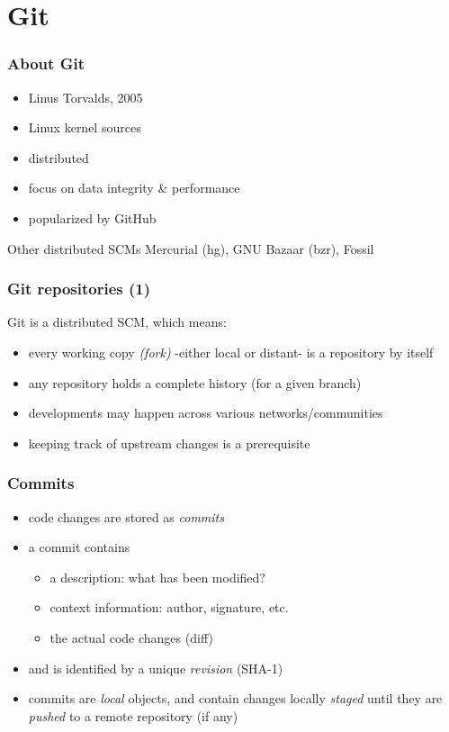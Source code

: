 \section{Git}
\begin{frame}
  \frametitle{About Git}
  \begin{itemize}
    \item Linus Torvalds, 2005
    \item Linux kernel sources
    \item distributed
    \item focus on data integrity \& performance
    \item popularized by GitHub
  \end{itemize}
  \begin{block}{Other distributed SCMs}
    Mercurial (hg), GNU Bazaar (bzr), Fossil
  \end{block}
\end{frame}

\begin{frame}
  \frametitle{Git repositories (1)}

  Git is a distributed SCM, which means:
  \begin{itemize}
    \item every working copy \textit{(fork)} -either local or distant-
      is a repository by itself
    \item any repository holds a complete history (for a given branch)
    \item developments may happen across various networks/communities
    \item keeping track of upstream changes is a prerequisite
  \end{itemize}
\end{frame}

\begin{frame}
  \frametitle{Commits}

  \begin{itemize}
    \item code changes are stored as \textit{commits}
    \item a commit contains
      \begin{itemize}
        \item a description: what has been modified?
        \item context information: author, signature, etc.
        \item the actual code changes (diff)
      \end{itemize}
    \item and is identified by a unique \textit{revision} (SHA-1)
    \item commits are \textit{local} objects, and contain changes locally
      \textit{staged} until they are \textit{pushed} to a remote repository
      (if any)
  \end{itemize}
\end{frame}

